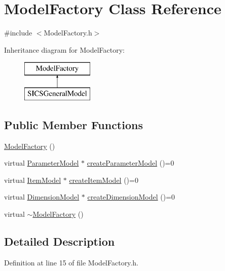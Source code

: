 \hypertarget{classModelFactory}{}\section{Model\+Factory Class Reference}
\label{classModelFactory}


{\ttfamily \#include $<$Model\+Factory.\+h$>$}

Inheritance diagram for Model\+Factory\+:\begin{figure}[H]
\begin{center}
\leavevmode
\includegraphics[height=2.000000cm]{classModelFactory}
\end{center}
\end{figure}
\subsection*{Public Member Functions}
\begin{DoxyCompactItemize}
\item 
\hyperlink{classModelFactory_aaf674444b913a74a2e1ee838cb6a9330}{Model\+Factory} ()
\item 
virtual \hyperlink{classParameterModel}{Parameter\+Model} $\ast$ \hyperlink{classModelFactory_adfa2a321dba41b9ba05e7805b9bfac2b}{create\+Parameter\+Model} ()=0
\item 
virtual \hyperlink{classItemModel}{Item\+Model} $\ast$ \hyperlink{classModelFactory_ab13ed21aabab9b4ba77173d0117a7cec}{create\+Item\+Model} ()=0
\item 
virtual \hyperlink{classDimensionModel}{Dimension\+Model} $\ast$ \hyperlink{classModelFactory_ae57ccc96f948d4df70cebc587ed0390b}{create\+Dimension\+Model} ()=0
\item 
virtual \hyperlink{classModelFactory_a4b3fc23369f942ad7f772aec8a76f9b7}{$\sim$\+Model\+Factory} ()
\end{DoxyCompactItemize}


\subsection{Detailed Description}


Definition at line 15 of file Model\+Factory.\+h.



